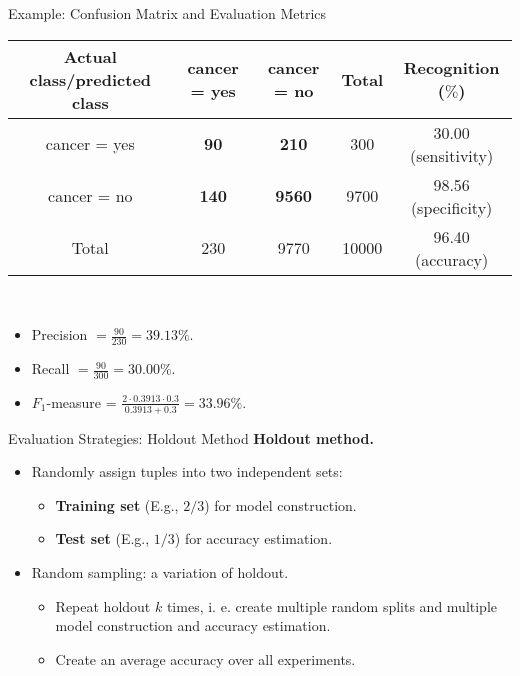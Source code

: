 \begin{frame}{Example: Confusion Matrix and Evaluation Metrics}
	\centering
	\begin{tabular}{|c|c|c|c|c|}
		\hline
		Actual class/predicted class & cancer = yes & cancer = no   & Total & Recognition ($\%$)  \\\hline
		cancer = yes                 & \textbf{90}  & \textbf{210}  & 300   & 30.00 (sensitivity) \\\hline
		cancer = no                  & \textbf{140} & \textbf{9560} & 9700  & 98.56 (specificity) \\\hline
		Total                        & 230          & 9770          & 10000 & 96.40 (accuracy)    \\\hline
	\end{tabular}\\[0.2cm]
	\begin{itemize}
		\item Precision $= \frac{90}{230} = 39.13 \%$.
		\item Recall $=\frac{90}{300} = 30.00 \%$.
		\item $F_1$-measure = $\frac{2 \cdot 0.3913 \cdot 0.3}{0.3913 + 0.3} = 33.96 \%$.
	\end{itemize}
\end{frame}

\begin{frame}{Evaluation Strategies: Holdout Method}
	\textbf{Holdout method.}
	\begin{itemize}
		\item Randomly assign tuples into two independent sets:
		      \begin{itemize}
			      \item \textbf{\color{airforceblue}Training set} (E.g., $2/3$) for model construction.
			      \item \textbf{\color{airforceblue}Test set} (E.g., $1/3$) for accuracy estimation.
		      \end{itemize}
		\item Random sampling: a variation of holdout.
		      \begin{itemize}
			      \item Repeat holdout $k$ times, i. e. create multiple random splits and
			            multiple model construction and accuracy estimation.
			      \item Create an average accuracy over all experiments.
		      \end{itemize}
	\end{itemize}

\end{frame}

